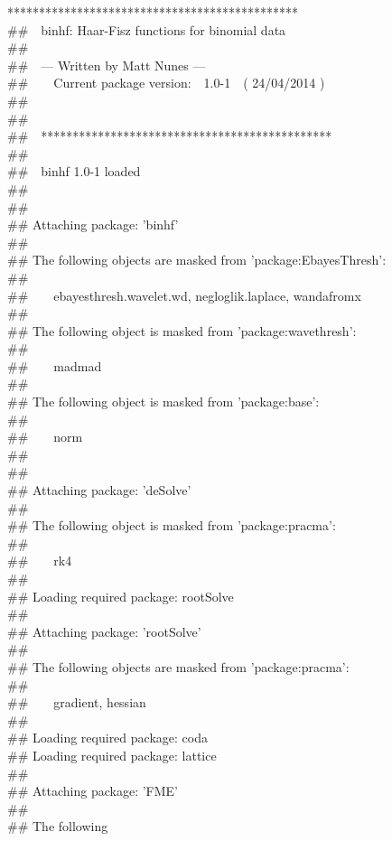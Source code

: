 \documentclass{article}\usepackage[]{graphicx}\usepackage[]{color}
\makeatletter
\newenvironment{kframe}{%
 \def\at@end@of@kframe{}%
 \ifinner\ifhmode%
  \def\at@end@of@kframe{\end{minipage}}%
  \begin{minipage}{\columnwidth}%
 \fi\fi%
 \def\FrameCommand##1{\hskip\@totalleftmargin \hskip-\fboxsep
 \colorbox{shadecolor}{##1}\hskip-\fboxsep
     \hskip-\linewidth \hskip-\@totalleftmargin \hskip\columnwidth}%
 \MakeFramed {\advance\hsize-\width
   \@totalleftmargin\z@ \linewidth\hsize
   \@setminipage}}%
 {\par\unskip\endMakeFramed%
 \at@end@of@kframe}
\newenvironment{knitrout}{}{} %
\makeatother
\begin{document}
\begin{knitrout}
\begin{kframe}
**********************************************\\\#\#\ \ binhf: Haar-Fisz functions for binomial data\\\#\# \\\#\#\ \ --- Written by Matt Nunes ---\\\#\#\ \ \ \ Current package version:\ \ 1.0-1\ \ ( 24/04/2014 ) \\\#\# \\\#\#\ \ \\\#\#\ \ **********************************************\\\#\#\ \ \\\#\#\ \ binhf 1.0-1 loaded\\\#\# \\\#\# \\\#\# Attaching package: 'binhf'\\\#\# \\\#\# The following objects are masked from 'package:EbayesThresh':\\\#\# \\\#\#\ \ \ \  ebayesthresh.wavelet.wd, negloglik.laplace, wandafromx\\\#\# \\\#\# The following object is masked from 'package:wavethresh':\\\#\# \\\#\#\ \ \ \  madmad\\\#\# \\\#\# The following object is masked from 'package:base':\\\#\# \\\#\#\ \ \ \  norm\\\#\# \\\#\# \\\#\# Attaching package: 'deSolve'\\\#\# \\\#\# The following object is masked from 'package:pracma':\\\#\# \\\#\#\ \ \ \  rk4\\\#\# \\\#\# Loading required package: rootSolve\\\#\# \\\#\# Attaching package: 'rootSolve'\\\#\# \\\#\# The following objects are masked from 'package:pracma':\\\#\# \\\#\#\ \ \ \  gradient, hessian\\\#\# \\\#\# Loading required package: coda\\\#\# Loading required package: lattice\\\#\# \\\#\# Attaching package: 'FME'\\\#\# \\\#\# The following 
\end{kframe}
\end{knitrout}
\end{document}
